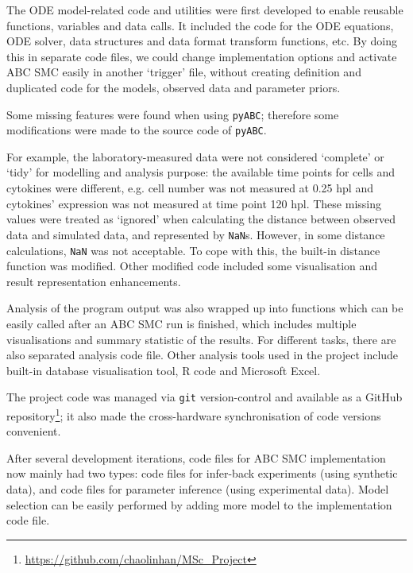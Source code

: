 The ODE model-related code and utilities were first developed to enable reusable functions, variables and data calls. It included the code for the ODE equations, ODE solver, data structures and data format transform functions, etc. By doing this in separate code files, we could change implementation options and activate ABC SMC easily in another `trigger' file, without creating definition and duplicated code for the models, observed data and parameter priors.

Some missing features were found when using \verb|pyABC|; therefore some modifications were made to the source code of \verb|pyABC|.

For example, the laboratory-measured data were not considered `complete' or `tidy' for modelling and analysis purpose: the available time points for cells and cytokines were different, e.g. cell number was not measured at 0.25 hpl and cytokines' expression was not measured at time point 120 hpl. These missing values were treated as `ignored' when calculating the distance between observed data and simulated data, and represented by \verb|NaN|s. However, in some distance calculations, \verb|NaN| was not acceptable. To cope with this, the built-in distance function was modified. Other modified code included some visualisation and result representation enhancements.

Analysis of the program output was also wrapped up into functions which can be easily called after an ABC SMC run is finished, which includes multiple visualisations and summary statistic of the results. For different tasks, there are also separated analysis code file. Other analysis tools used in the project include built-in database visualisation tool, R code and Microsoft Excel.

The project code was managed via \verb|git| version-control and available as a GitHub repository\footnote{\url{https://github.com/chaolinhan/MSc_Project}}; it also made the cross-hardware synchronisation of code versions convenient.

After several development iterations, code files for ABC SMC implementation now mainly had two types: code files for infer-back experiments (using synthetic data), and code files for parameter inference (using experimental data). Model selection can be easily performed by adding more model to the implementation code file.



